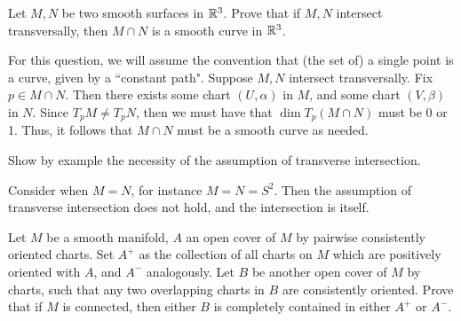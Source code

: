%
%


\newpage
\label{q43}
\begin{qu}[num=43.1]
    Let $ M, N $ be two smooth surfaces in $ \mathbb{R}^{3} $. Prove that if $ M, N $
    intersect transversally, then $ M \cap N $ is a smooth curve in $ \mathbb{R}^{3} $.
\end{qu}

\begin{soln}
    For this question, we will assume the convention that (the set of) a single
    point is a curve, given by a ``constant path". \vsp
    Suppose $ M, N $ intersect transversally. Fix $ p \in M \cap N $. Then there
    exists some chart $ (U, \alpha) $ in $ M $, and some chart $ (V, \beta) $ in
    $ N $. Since $ T_{p}M \neq T_{p}N $, then we must have that $ \dim T_{p}
    (M\cap N) $ must be 0 or 1. Thus, it follows that $ M \cap N $ must be a
    smooth curve as needed.
\end{soln}

\begin{qu}[num=43.2]
    Show by example the necessity of the assumption of transverse intersection.
\end{qu}

\begin{soln}
    Consider when $ M = N $, for instance $ M=N=S^{2} $. Then the assumption of
    transverse intersection does not hold, and the intersection is itself.
\end{soln}

\newpage
\label{q44}
\begin{qu}[num=44]
    Let $ M $ be a smooth manifold, $ A $ an open cover of $ M $ by pairwise
    consistently oriented charts. Set $ A^{+} $ as the collection of all charts
    on $ M $ which are positively oriented with $ A $, and $ A^{-} $ analogously.
    \vsp
    Let $ B $ be another open cover of $ M $ by charts, such that any two
    overlapping charts in $ B $ are consistently oriented.
    Prove that if $ M $ is connected, then either $ B $ is completely contained
    in either $ A^{+} $ or $ A^{-} $.
\end{qu}

